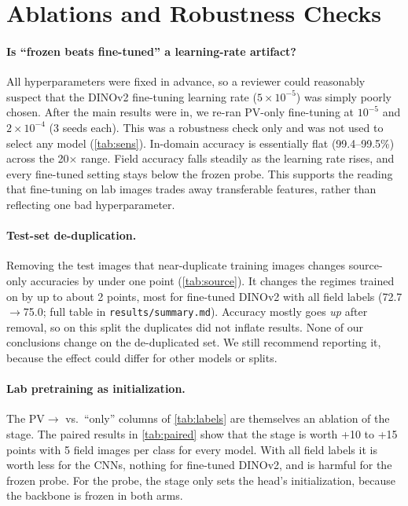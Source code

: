 \section{Ablations and Robustness Checks}
\label{sec:ablations}

\paragraph{Is ``frozen beats fine-tuned'' a learning-rate artifact?}
All hyperparameters were fixed in advance, so a reviewer could reasonably suspect that the DINOv2 fine-tuning learning rate ($5\times10^{-5}$) was simply poorly chosen.
After the main results were in, we re-ran PV-only fine-tuning at $10^{-5}$ and $2\times10^{-4}$ (3 seeds each). This was a robustness check only and was not used to select any model (\cref{tab:sens}).
In-domain accuracy is essentially flat (99.4--99.5\%) across the 20$\times$ range. Field accuracy falls steadily as the learning rate rises, and every fine-tuned setting stays below the frozen probe.
This supports the reading that fine-tuning on lab images trades away transferable features, rather than reflecting one bad hyperparameter.

\begin{table}[t]
\centering\scriptsize

\caption{\textbf{DINOv2 ViT-S, trained on \PV only:} fine-tuning learning rate vs.\ in-domain (PV) and field (PD) top-1. Mean $\pm$ std over 3 seeds. The check was run after the main results and was not used for selection.}
\label{tab:sens}
\end{table}

\paragraph{Test-set de-duplication.}
Removing the \PDdups \PD test images that near-duplicate \PD training images changes source-only accuracies by under one point (\cref{tab:source}). It changes the regimes trained on \PD by up to about 2 points, most for fine-tuned DINOv2 with all field labels (72.7$\rightarrow$75.0; full table in \texttt{results/summary.md}).
Accuracy mostly goes \emph{up} after removal, so on this split the duplicates did not inflate results. None of our conclusions change on the de-duplicated set. We still recommend reporting it, because the effect could differ for other models or splits.

\paragraph{Lab pretraining as initialization.}
The PV$\rightarrow$ vs.\ ``only'' columns of \cref{tab:labels} are themselves an ablation of the \PV stage. The paired results in \cref{tab:paired} show that the \PV stage is worth +10 to +15 points with 5 field images per class for every model. With all field labels it is worth less for the CNNs, nothing for fine-tuned DINOv2, and is harmful for the frozen probe. For the probe, the \PV stage only sets the head's initialization, because the backbone is frozen in both arms.
